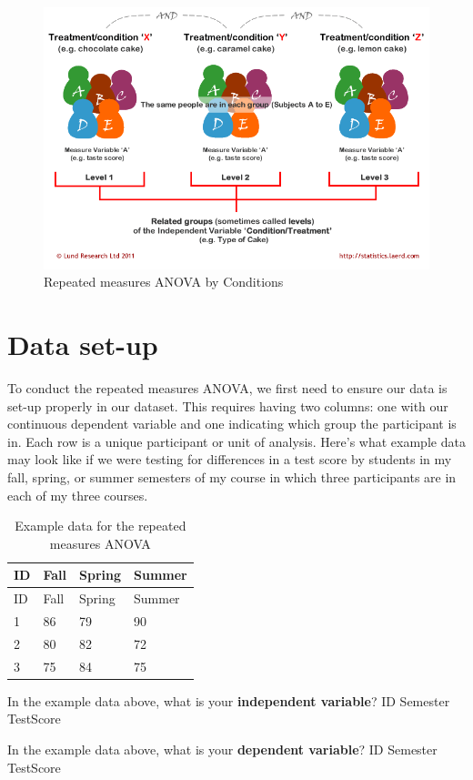 \documentclass[
]{book}
\begin{document}
\begin{figure}

{\centering \includegraphics[width=0.8\linewidth]{images/05-repeated-measures-anova/Laerd2} 

}

\caption{Repeated measures ANOVA by Conditions}\label{fig:unnamed-chunk-2}
\end{figure}

\hypertarget{data-set-up-3}{%
\section{Data set-up}\label{data-set-up-3}}

To conduct the repeated measures ANOVA, we first need to ensure our data is set-up properly in our dataset. This requires having two columns: one with our continuous dependent variable and one indicating which group the participant is in. Each row is a unique participant or unit of analysis. Here's what example data may look like if we were testing for differences in a test score by students in my fall, spring, or summer semesters of my course in which three participants are in each of my three courses.

\begin{longtable}[]{@{}llll@{}}
\caption{Example data for the repeated measures ANOVA}\tabularnewline
\toprule
ID & Fall & Spring & Summer\tabularnewline
\midrule
\endfirsthead
\toprule
ID & Fall & Spring & Summer\tabularnewline
\midrule
\endhead
1 & 86 & 79 & 90\tabularnewline
2 & 80 & 82 & 72\tabularnewline
3 & 75 & 84 & 75\tabularnewline
\bottomrule
\end{longtable}

In the example data above, what is your \textbf{independent variable}? ID Semester TestScore

In the example data above, what is your \textbf{dependent variable}? ID Semester TestScore
\end{document}
